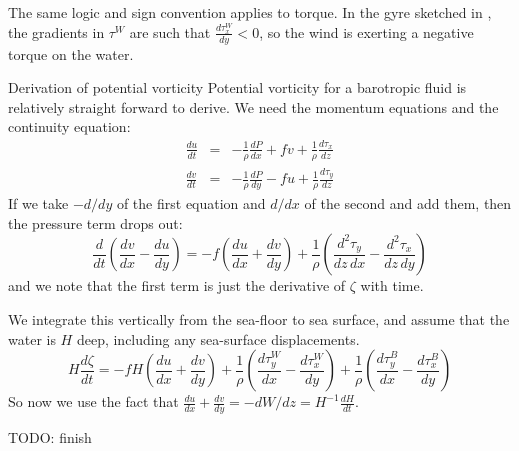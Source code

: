 The same logic and sign convention applies to torque.  In the gyre sketched in , the gradients in $\tau^W$ are such that $\frac{d\tau_x^W}{dy} < 0$, so the wind is exerting a negative torque on the water.  


\begin{derivbox}[label={box:potentialvort}]{Derivation of potential vorticity}
Potential vorticity for a barotropic fluid is relatively straight forward to derive.  We  need the momentum equations and the continuity equation:
\begin{eqnarray*}
    \frac{du}{dt} & = & -\frac{1}{\rho}\frac{dP}{dx} + fv + \frac{1}{\rho}\frac{d\tau_x}{dz}\\
    \frac{dv}{dt} & = & -\frac{1}{\rho}\frac{dP}{dy} - fu + \frac{1}{\rho}\frac{d\tau_y}{dz}
\end{eqnarray*}
If we take $-d/dy$ of the first equation and $d/dx$ of the second and add them, then the pressure term drops out:
\begin{equation}
    \frac{d}{dt} \left( \frac{dv}{dx} - \frac{du}{dy}\right) = -f \left(\frac{du}{dx} + \frac{dv}{dy} \right) + \frac{1}{\rho}\left(\frac{d^2\tau_y}{dz\,dx} - \frac{d^2\tau_x}{dz\,dy}\right)
\end{equation}
and we note that the first term is just the derivative of $\zeta$ with time.  

We integrate this vertically from the sea-floor to sea surface, and assume that the water is $H$ deep, including any sea-surface displacements.   
\begin{equation}
    H\frac{d\zeta}{dt}  = -f H \left(\frac{du}{dx} + \frac{dv}{dy} \right) + \frac{1}{\rho}\left(\frac{d\tau_y^W}{dx} - \frac{d\tau_x^W}{dy}\right) + \frac{1}{\rho}\left(\frac{d\tau_y^B}{dx} - \frac{d\tau_x^B}{dy}\right) 
\end{equation}
So now we use the fact that $\frac{du}{dx} + \frac{dv}{dy} = -dW/dz = H^{-1}\frac{dH}{dt}$.  

TODO: finish
\end{derivbox}

